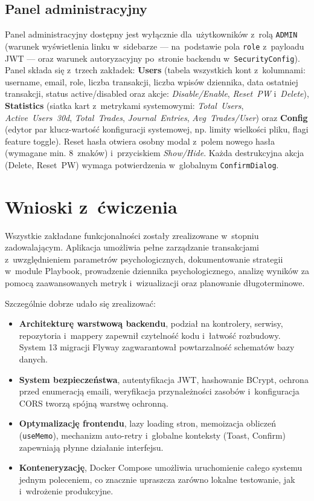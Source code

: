 \documentclass[12pt,a4paper]{article}
\begin{document}
\subsection*{Panel administracyjny}
Panel administracyjny dostępny jest wyłącznie dla~użytkowników z~rolą \texttt{ADMIN} (warunek wyświetlenia linku w~sidebarze --- na~podstawie pola \texttt{role} z~payloadu JWT --- oraz warunek autoryzacyjny po~stronie backendu w~\texttt{SecurityConfig}). Panel składa się z~trzech zakładek: \textbf{Users} (tabela wszystkich kont z~kolumnami: username, email, role, liczba transakcji, liczba wpisów dziennika, data ostatniej transakcji, status active/disabled oraz akcje: \emph{Disable/Enable}, \emph{Reset~PW} i~\emph{Delete}), \textbf{Statistics} (siatka kart z~metrykami systemowymi: \emph{Total~Users}, \emph{Active~Users~30d}, \emph{Total~Trades}, \emph{Journal~Entries}, \emph{Avg~Trades/User}) oraz \textbf{Config} (edytor par klucz-wartość konfiguracji systemowej, np. limity wielkości pliku, flagi feature toggle). Reset hasła otwiera osobny modal z~polem nowego hasła (wymagane min. 8~znaków) i~przyciskiem \emph{Show/Hide}. Każda destrukcyjna akcja (Delete, Reset~PW) wymaga potwierdzenia w~globalnym \texttt{ConfirmDialog}.

\section{Wnioski z~ćwiczenia}

Wszystkie zakładane funkcjonalności zostały zrealizowane w~stopniu zadowalającym. Aplikacja umożliwia pełne zarządzanie transakcjami z~uwzględnieniem parametrów psychologicznych, dokumentowanie strategii w~module Playbook, prowadzenie dziennika psychologicznego, analizę wyników za pomocą zaawansowanych metryk i~wizualizacji oraz planowanie długoterminowe.

Szczególnie dobrze udało się zrealizować:
\begin{itemize}
  \item \textbf{Architekturę warstwową backendu}, podział na kontrolery, serwisy, repozytoria i~mappery zapewnił czytelność kodu i~łatwość rozbudowy. System 13 migracji Flyway zagwarantował powtarzalność schematów bazy danych.
  \item \textbf{System bezpieczeństwa}, autentyfikacja JWT, hashowanie BCrypt, ochrona przed enumeracją emaili, weryfikacja przynależności zasobów i~konfiguracja CORS tworzą spójną warstwę ochronną.
  \item \textbf{Optymalizację frontendu}, lazy loading stron, memoizacja obliczeń (\texttt{useMemo}), mechanizm auto-retry i~globalne konteksty (Toast, Confirm) zapewniają płynne działanie interfejsu.
  \item \textbf{Konteneryzację}, Docker Compose umożliwia uruchomienie całego systemu jednym poleceniem, co znacznie upraszcza zarówno lokalne testowanie, jak i~wdrożenie produkcyjne.
\end{itemize}
\end{document}
